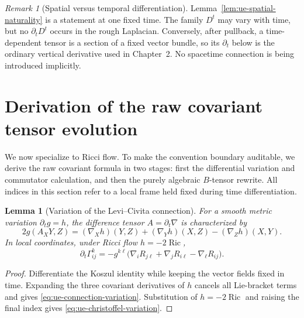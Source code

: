 \documentclass[10pt]{coll-l}
\newtheorem{lemma}[theorem]{Lemma}
\theoremstyle{definition}
\theoremstyle{remark}
\newtheorem{remark}[theorem]{Remark}
\numberwithin{section}{chapter}
\numberwithin{equation}{chapter}
\newcommand{\Ric}{\operatorname{Ric}}
\begin{document}
\begin{remark}[Spatial versus temporal differentiation]
\label{rem:ue-space-time-separation}
Lemma~\ref{lem:ue-spatial-naturality} is a statement at one fixed time.
The family $D^t$ may vary with time, but no $\partial_tD^t$ occurs in the
rough Laplacian.  Conversely, after pullback, a time-dependent tensor is a
section of a fixed vector bundle, so its $\partial_t$ below is the ordinary
vertical derivative used in Chapter~2.  No spacetime connection is being
introduced implicitly.
\end{remark}

\section{Derivation of the raw covariant tensor evolution}
\label{sec:ue-raw}

We now specialize to Ricci flow.  To make the convention boundary auditable,
we derive the raw covariant formula in two stages: first the differential
variation and commutator calculation, and then the purely algebraic
$B$-tensor rewrite.  All indices in this section refer to a local frame held
fixed during time differentiation.

\begin{lemma}[Variation of the Levi--Civita connection]
\label{lem:ue-connection-variation}
For a smooth metric variation $\partial_tg=h$, the difference tensor
$A=\partial_t\nabla$ is characterized by
\begin{equation}
 2g(A_XY,Z)
  =(\nabla_Xh)(Y,Z)+(\nabla_Yh)(X,Z)-(\nabla_Zh)(X,Y).        \label{eq:ue-connection-variation}
\end{equation}
In local coordinates, under Ricci flow $h=-2\Ric$,
\begin{equation}
 \partial_t\Gamma_{ij}^{k}
  =-g^{k\ell}\bigl(
      \nabla_iR_{j\ell}+\nabla_jR_{i\ell}-\nabla_\ell R_{ij}
    \bigr).                                                \label{eq:ue-christoffel-variation}
\end{equation}
\end{lemma}

\begin{proof}
Differentiate the Koszul identity while keeping the vector fields fixed in
time.  Expanding the three covariant derivatives of $h$ cancels all
Lie-bracket terms and gives \eqref{eq:ue-connection-variation}.
Substitution of $h=-2\Ric$ and raising the final index gives
\eqref{eq:ue-christoffel-variation}.
\end{proof}
\end{document}
